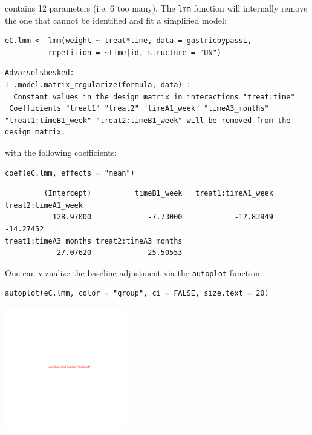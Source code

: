 \documentclass[12pt]{article}
\begin{document}
contains 12 parameters (i.e. 6 too many). The \texttt{lmm} function will
internally remove the one that cannot be identified and fit a
simplified model:
\lstset{language=r,label= ,caption= ,captionpos=b,numbers=none}
\begin{lstlisting}
eC.lmm <- lmm(weight ~ treat*time, data = gastricbypassL,
	      repetition = ~time|id, structure = "UN")
\end{lstlisting}

\begin{verbatim}
Advarselsbesked:
I .model.matrix_regularize(formula, data) :
  Constant values in the design matrix in interactions "treat:time"
 Coefficients "treat1" "treat2" "timeA1_week" "timeA3_months" "treat1:timeB1_week" "treat2:timeB1_week" will be removed from the design matrix.
\end{verbatim}


with the following coefficients:
\lstset{language=r,label= ,caption= ,captionpos=b,numbers=none}
\begin{lstlisting}
coef(eC.lmm, effects = "mean")
\end{lstlisting}

\begin{verbatim}
         (Intercept)          timeB1_week   treat1:timeA1_week   treat2:timeA1_week 
           128.97000             -7.73000            -12.83949            -14.27452 
treat1:timeA3_months treat2:timeA3_months 
           -27.07620            -25.50553
\end{verbatim}


One can vizualize the baseline adjustment via the \texttt{autoplot} function:
\lstset{language=r,label= ,caption= ,captionpos=b,numbers=none}
\begin{lstlisting}
autoplot(eC.lmm, color = "group", ci = FALSE, size.text = 20)
\end{lstlisting}

\begin{center}
\includegraphics[width=0.4\textwidth]{./figures/gg-baseAdj.pdf}
\end{center}
\end{document}
